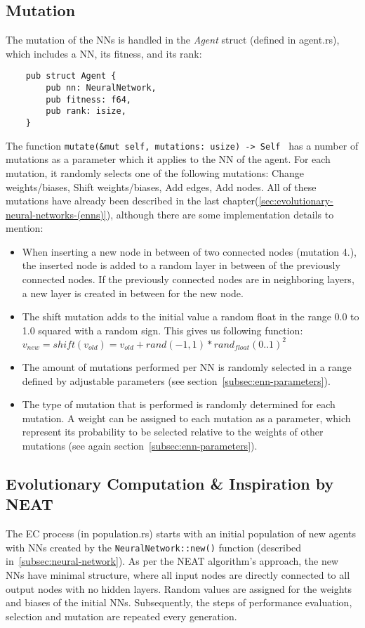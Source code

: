 \subsection{Mutation}\label{subsec:mutation}
The mutation of the NNs is handled in the \textit{Agent} struct (defined in agent.rs), which includes a NN, its fitness, and its rank:
\begin{verbatim}
    pub struct Agent {
        pub nn: NeuralNetwork,
        pub fitness: f64,
        pub rank: isize,
    }
\end{verbatim}
The function \texttt{mutate(&mut self, mutations: usize) -> Self {} } has a number of mutations as a parameter which it applies to the NN of the agent.
For each mutation, it randomly selects one of the following mutations: Change weights/biases, Shift weights/biases, Add edges, Add nodes.
All of these mutations have already been described in the last chapter(\ref{sec:evolutionary-neural-networks-(enns)}), although there are some implementation details to mention:
\begin{itemize}
    \item When inserting a new node in between of two connected nodes (mutation 4.), the inserted node is added to a random layer in between of the previously connected nodes.
    If the previously connected nodes are in neighboring layers, a new layer is created in between for the new node.
    \item The shift mutation adds to the initial value a random float in the range 0.0 to 1.0 squared with a random sign.
    This gives us following function: \\
    $v_{new} = shift(v_{old}) = v_{old} + rand(-1, 1) * rand_{float}(0..1)^2$
    \item The amount of mutations performed per NN is randomly selected in a range defined by adjustable parameters (see section~\ref{subsec:enn-parameters}).
    \item The type of mutation that is performed is randomly determined for each mutation.
    A weight can be assigned to each mutation as a parameter, which represent its probability to be selected relative to the weights of other mutations (see again section~\ref{subsec:enn-parameters}).
\end{itemize}

\subsection{Evolutionary Computation \& Inspiration by NEAT}\label{subsec:evolutionary-computation-&-inspiration-by-neat}
The EC process (in population.rs) starts with an initial population of new agents with NNs created by the \texttt{NeuralNetwork::new()} function (described in~\ref{subsec:neural-network}).
As per the NEAT algorithm's approach, the new NNs have minimal structure, where all input nodes are directly connected to all output nodes with no hidden layers.
Random values are assigned for the weights and biases of the initial NNs.
Subsequently, the steps of performance evaluation, selection and mutation are repeated every generation.

